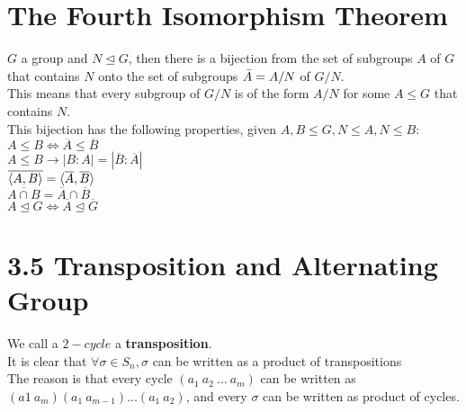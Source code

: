 \documentclass{article}
\begin{document}
\section{The Fourth Isomorphism Theorem}
$G$ a group and $N \trianglelefteq G$, then there is a bijection from the set of subgroups $A$ of $G$ that contains $N$ onto the set of subgroups $\Bar{A} = A/N$ of $G/N$.\\
This means that every subgroup of $G/N$ is of the form $A/N$ for some $A \leq G$ that contains $N$.\\
This bijection has the following properties, given $A, B \leq G, N \leq A, N \leq B$:\\
$A \leq B \iff \overline{A} \leq \overline{B}$\\
$A \leq B \rightarrow |B:A| = |\overline{B}:\overline{A}|$\\
$\overline{\braket{A, B}} = \braket{\overline{A}, \overline{B}}$\\
$\overline{A \cap B} = \overline{A} \cap \overline{B}$\\
$A \trianglelefteq G \iff \overline{A} \trianglelefteq \overline{G}$
\section{3.5 Transposition and Alternating Group}
We call a $2-cycle$ a \textbf{transposition}.\\
It is clear that $\forall \sigma \in S_n, \sigma$ can be written as a product of transpositions\\
The reason is that every cycle $(a_1\ a_2\ ...\ a_m)$ can be written as $(a1\ a_m)(a_1\ a_{m-1})...(a_1\ a_2)$, and every $\sigma$ can be written as product of cycles.\\
\end{document}
